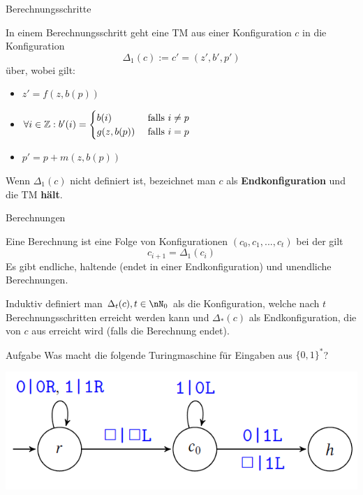 \begin{frame}{Berechnungsschritte}
	\begin{Definition}
		In einem Berechnungsschritt geht eine TM aus einer Konfiguration $c$ 
		in die Konfiguration $$\Delta_1(c) := c' = (z',b',p')$$ über, wobei gilt:
		\begin{itemize}[<+->]
			\item $z' = f(z,b(p))$
			\item $\forall i\in \mathbb{Z}: b'(i) =
			\begin{cases}
			b(i) & \text{ falls } i\not=p \\
			g(z,b(p)) & \text{ falls } i=p
			\end{cases}$
			\item $p' = p + m(z,b(p))$
		\end{itemize}
		\bigskip
		
		\pause
		Wenn $\Delta_1(c)$ nicht definiert ist, bezeichnet man $c$ als \textbf{Endkonfiguration} und die TM \textbf{hält}.
	\end{Definition}
\end{frame}

\begin{frame}{Berechnungen}
	\begin{Definition}
		Eine Berechnung ist eine Folge von Konfigurationen $(c_0, c_1, ..., c_t)$ bei der gilt $$c_{i+1} = \Delta_1(c_i)$$ \pause
		Es gibt endliche, haltende (endet in einer Endkonfiguration) und unendliche Berechnungen.
		\bigskip
		
		\pause
		Induktiv definiert man $\Delta_t(c) , t\in\nN_0$ als die Konfiguration, welche nach $t$ Berechnungsschritten erreicht werden kann und $\Delta_*(c)$ als Endkonfiguration, die von $c$ aus erreicht wird (falls die Berechnung endet).
	\end{Definition}
\end{frame}

\begin{frame}{Aufgabe}
	Was macht die folgende Turingmaschine für Eingaben aus $\{0, 1\}^*$?
	
	\smallskip
	\includegraphics[scale=0.65]{turing/addBin1}
	
	\smallskip
\end{frame}


